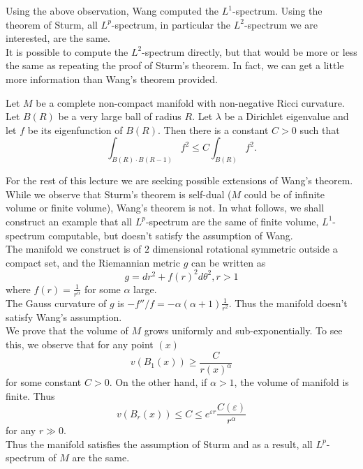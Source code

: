 Using the above observation, Wang computed the $L^1$-spectrum. Using the theorem
of Sturm, all $L^p$-spectrum, in particular the $L^2$-spectrum we are 
interested, are the same.
\\

It is possible to compute the $L^2$-spectrum directly, but that would be more or
less the same as repeating the proof of Sturm's theorem. In fact, we can get a
little more information than Wang's theorem provided.

\begin{lemma}
Let $M$ be a complete non-compact manifold with non-negative Ricci curvature.
Let $B(R)$ be a very large ball of radius $R$. Let $\lambda$ be a Dirichlet
eigenvalue and let $f$ be its eigenfunction of $B(R)$. Then there is a constant
$C > 0$ such that
\[
\int_{B(R)\cdot B(R-1)} f^2 \leqslant C\int_{B(R)} f^2.
\]
\end{lemma}

For the rest of this lecture we are seeking possible extensions of Wang's
theorem. While we observe that Sturm's theorem is self-dual ($M$ could be of
infinite volume or finite volume), Wang's theorem is not. In what follows, we
shall construct an example that all $L^p$-spectrum are the same of finite 
volume, $L^1$-spectrum computable, but doesn't satisfy the assumption of Wang.
\\

The manifold we construct is of $2$ dimensional rotational symmetric outside a 
compact set, and the Riemannian metric $g$ can be written as 
\[
g = dr^2 + f(r)^2 d\theta^2, r > 1
\]
where $f(r) = \frac{1}{r^\alpha}$ for some $\alpha$ large.
\\

The Gauss curvature of $g$ is $-f''/f = -\alpha(\alpha + 1)\frac{1}{r^2}$. Thus
the manifold doesn't satisfy Wang's assumption.
\\

We prove that the volume of $M$ grows uniformly and sub-exponentially. To see
this, we observe that for any point $(x)$
\[
v(B_1(x)) \geqslant \frac{C}{r(x)^\alpha}
\]
for some constant $C > 0$. On the other hand, if $\alpha > 1$, the volume of
manifold is finite. Thus
\[
v(B_r(x)) \leqslant C \leqslant e^{\varepsilon r}\frac{C(\varepsilon)}{r^\alpha}
\]
for any $r \gg 0$.
\\

Thus the manifold satisfies the assumption of Sturm and as a result, all 
$L^p$-spectrum of $M$ are the same.
\\

